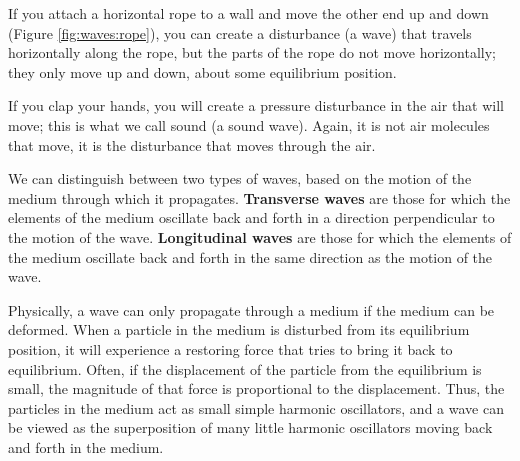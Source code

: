 If you attach a horizontal rope to a wall and move the other end up and down (Figure \ref{fig:waves:rope}), you can create a disturbance (a wave) that travels horizontally along the rope, but the parts of the rope do not move horizontally; they only move up and down, about some equilibrium position. 

If you clap your hands, you will create a pressure disturbance in the air that will move; this is what we call sound (a sound wave). Again, it is not air molecules that move, it is the disturbance that moves through the air. 

We can distinguish between two types of waves, based on the motion of the medium through which it propagates. \textbf{Transverse waves} are those for which the elements of the medium oscillate back and forth in a direction perpendicular to the motion of the wave. \textbf{Longitudinal waves} are those for which the elements of the medium oscillate back and forth in the same direction as the motion of the wave.

Physically, a wave can only propagate through a medium if the medium can be deformed. When a particle in the medium is disturbed from its equilibrium position, it will experience a restoring force that tries to bring it back to equilibrium. Often, if the displacement of the particle from the equilibrium is small, the magnitude of that force is proportional to the displacement. Thus, the particles in the medium act as small simple harmonic oscillators, and a wave can be viewed as the superposition of many little harmonic oscillators moving back and forth in the medium. 

